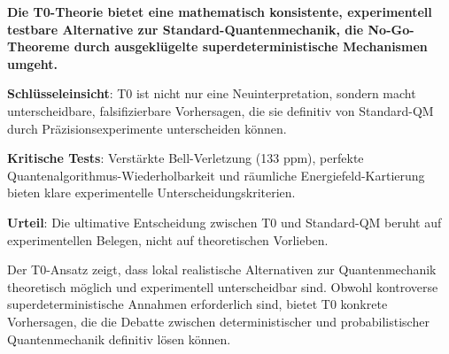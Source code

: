 \documentclass[12pt,a4paper]{article}
\begin{document}
			\begin{tcolorbox}[colback=green!5!white,colframe=green!75!black,title=Abschließende Bewertung]
				\textbf{Die T0-Theorie bietet eine mathematisch konsistente, experimentell testbare Alternative zur Standard-Quantenmechanik, die No-Go-Theoreme durch ausgeklügelte superdeterministische Mechanismen umgeht.} 
				
				\textbf{Schlüsseleinsicht}: T0 ist nicht nur eine Neuinterpretation, sondern macht unterscheidbare, falsifizierbare Vorhersagen, die sie definitiv von Standard-QM durch Präzisionsexperimente unterscheiden können.
				
				\textbf{Kritische Tests}: Verstärkte Bell-Verletzung (133 ppm), perfekte Quantenalgorithmus-Wiederholbarkeit und räumliche Energiefeld-Kartierung bieten klare experimentelle Unterscheidungskriterien.
				
				\textbf{Urteil}: Die ultimative Entscheidung zwischen T0 und Standard-QM beruht auf experimentellen Belegen, nicht auf theoretischen Vorlieben.
			\end{tcolorbox}
			
			Der T0-Ansatz zeigt, dass lokal realistische Alternativen zur Quantenmechanik theoretisch möglich und experimentell unterscheidbar sind. Obwohl kontroverse superdeterministische Annahmen erforderlich sind, bietet T0 konkrete Vorhersagen, die die Debatte zwischen deterministischer und probabilistischer Quantenmechanik definitiv lösen können.
			
\end{document}
